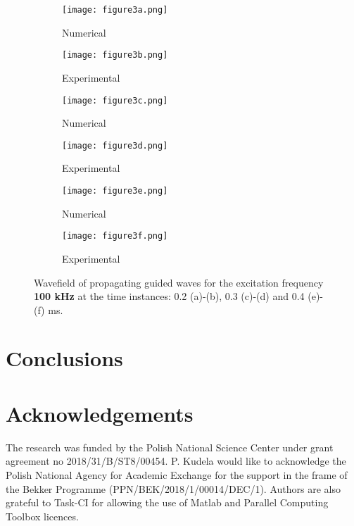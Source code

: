 \documentclass[runningheads]{llncs}
\begin{document}
\begin{figure} [h!]
	\centering
	\begin{subfigure}[b]{0.49\textwidth}
		\centering
		\texttt{[image: figure3a.png]}
		\caption{Numerical}
		\label{fig:wavefield100a}
	\end{subfigure}
	\begin{subfigure}[b]{0.49\textwidth}
		\centering
		\texttt{[image: figure3b.png]}
		\caption{Experimental}
		\label{fig:wavefield100b}
	\end{subfigure}
	\begin{subfigure}[b]{0.49\textwidth}
		\centering
		\texttt{[image: figure3c.png]}
		\caption{Numerical}
		\label{fig:wavefield100c}
	\end{subfigure}
	\begin{subfigure}[b]{0.49\textwidth}
		\centering
		\texttt{[image: figure3d.png]}
		\caption{Experimental}
		\label{fig:wavefield100d}
	\end{subfigure}
	\begin{subfigure}[b]{0.49\textwidth}
		\centering
		\texttt{[image: figure3e.png]}
		\caption{Numerical}
		\label{fig:wavefield100e}
	\end{subfigure}
	\begin{subfigure}[b]{0.49\textwidth}
		\centering
		\texttt{[image: figure3f.png]}
		\caption{Experimental}
		\label{fig:wavefield100f}
	\end{subfigure}
	\caption{Wavefield of propagating guided waves for the excitation frequency \textbf{100 kHz} at the time instances:  0.2 (a)-(b), 0.3 (c)-(d) and 0.4 (e)-(f) ms. }
	\label{fig:wavefield100}
\end{figure}

\section{Conclusions}

\section*{Acknowledgements}
The research was funded by the Polish National Science Center under grant agreement no 2018/31/B/ST8/00454. 
P. Kudela would like to acknowledge the Polish National Agency for Academic Exchange for the support in the frame of the Bekker Programme (PPN/BEK/2018/1/00014/DEC/1). 
Authors are also grateful to Task-CI for allowing the use of Matlab and Parallel Computing Toolbox licences. 
%
%
%
 
 
%
\end{document}
